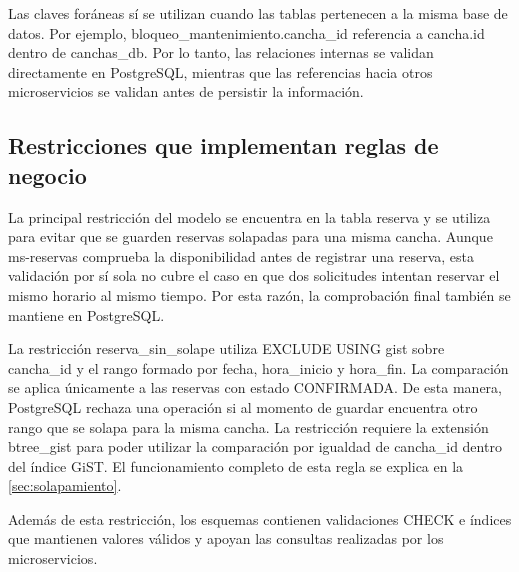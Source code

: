 Las claves foráneas sí se utilizan cuando las tablas pertenecen a la misma base
de datos. Por ejemplo, bloqueo\_mantenimiento.cancha\_id referencia a cancha.id
dentro de canchas\_db. Por lo tanto, las relaciones internas se validan
directamente en PostgreSQL, mientras que las referencias hacia otros
microservicios se validan antes de persistir la información.

\subsection{Restricciones que implementan reglas de negocio}
\label{sec:restricciones}

La principal restricción del modelo se encuentra en la tabla reserva y se utiliza
para evitar que se guarden reservas solapadas para una misma cancha. Aunque
ms-reservas comprueba la disponibilidad antes de registrar una reserva, esta
validación por sí sola no cubre el caso en que dos solicitudes intentan reservar
el mismo horario al mismo tiempo. Por esta razón, la comprobación final también
se mantiene en PostgreSQL.

La restricción reserva\_sin\_solape utiliza EXCLUDE USING gist sobre cancha\_id
y el rango formado por fecha, hora\_inicio y hora\_fin. La comparación se aplica
únicamente a las reservas con estado CONFIRMADA. De esta manera, PostgreSQL
rechaza una operación si al momento de guardar encuentra otro rango que se
solapa para la misma cancha. La restricción requiere la extensión btree\_gist
para poder utilizar la comparación por igualdad de cancha\_id dentro del índice
GiST. El funcionamiento completo de esta regla se explica en la
\cref{sec:solapamiento}.

Además de esta restricción, los esquemas contienen validaciones CHECK e índices
que mantienen valores válidos y apoyan las consultas realizadas por los
microservicios.

